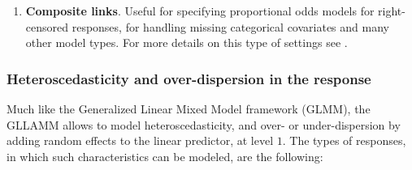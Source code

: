 \begin{enumerate}
\begin{enumerate}
		
		\item \textbf{Composite links}. Useful for specifying proportional odds models for right-censored responses, for handling missing categorical covariates and many other model types. For more details on this type of settings see \citet{Skrondal_et_al_2004b}.
	\end{enumerate}

\end{enumerate}





\subsubsection{Heteroscedasticity and over-dispersion in the response} \label{ss_sect:het}

Much like the Generalized Linear Mixed Model framework (GLMM), the GLLAMM allows to model heteroscedasticity, and over- or under-dispersion by adding random effects to the linear predictor, at level $1$. The types of responses, in which such characteristics can be modeled, are the following:

